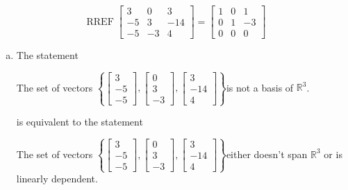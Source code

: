 \begin{exerciseAnswer} 


\[\operatorname{RREF} \left[\begin{array}{ccc}
3 & 0 & 3 \\
-5 & 3 & -14 \\
-5 & -3 & 4
\end{array}\right] = \left[\begin{array}{ccc}
1 & 0 & 1 \\
0 & 1 & -3 \\
0 & 0 & 0
\end{array}\right] \]


\begin{enumerate}[(a)]
\item The statement 
\begin{center}\begin{minipage}{0.8\textwidth}
 The set of vectors \( \left\{ \left[\begin{array}{c}
3 \\
-5 \\
-5
\end{array}\right] , \left[\begin{array}{c}
0 \\
3 \\
-3
\end{array}\right] , \left[\begin{array}{c}
3 \\
-14 \\
4
\end{array}\right] \right\} \)is not a basis of \(\mathbb{R}^3\). 
\end{minipage}\end{center}
     is equivalent to the statement 
\begin{center}\begin{minipage}{0.8\textwidth}
 The set of vectors \( \left\{ \left[\begin{array}{c}
3 \\
-5 \\
-5
\end{array}\right] , \left[\begin{array}{c}
0 \\
3 \\
-3
\end{array}\right] , \left[\begin{array}{c}
3 \\
-14 \\
4
\end{array}\right] \right\} \)either doesn't span \(\mathbb{R}^3\) or is linearly dependent.
\end{minipage}\end{center}
    

\end{enumerate}
\end{exerciseAnswer}
